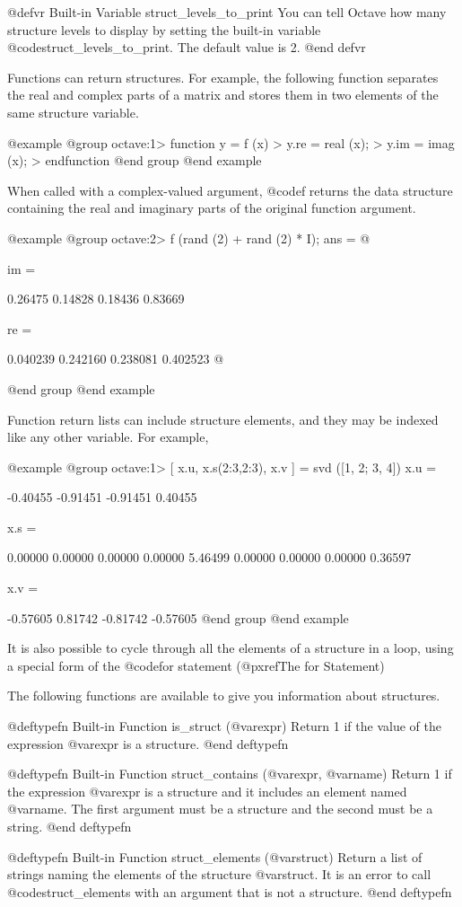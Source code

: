 @defvr {Built-in Variable} struct_levels_to_print
You can tell Octave how many structure levels to display by setting the
built-in variable @code{struct_levels_to_print}.  The default value is 2.
@end defvr

Functions can return structures.  For example, the following function
separates the real and complex parts of a matrix and stores them in two
elements of the same structure variable.

@example
@group
octave:1> function y = f (x)
> y.re = real (x);
> y.im = imag (x);
> endfunction
@end group
@end example

When called with a complex-valued argument, @code{f} returns the data
structure containing the real and imaginary parts of the original
function argument.

@example
@group
octave:2> f (rand (2) + rand (2) * I);
ans =
@{
  im =

    0.26475  0.14828
    0.18436  0.83669

  re =

    0.040239  0.242160
    0.238081  0.402523
@}
@end group
@end example

Function return lists can include structure elements, and they may be
indexed like any other variable.  For example,

@example
@group
octave:1> [ x.u, x.s(2:3,2:3), x.v ] = svd ([1, 2; 3, 4])
x.u =

  -0.40455  -0.91451
  -0.91451   0.40455

x.s =

  0.00000  0.00000  0.00000
  0.00000  5.46499  0.00000
  0.00000  0.00000  0.36597

x.v =

  -0.57605   0.81742
  -0.81742  -0.57605
@end group
@end example

It is also possible to cycle through all the elements of a structure in
a loop, using a special form of the @code{for} statement
(@pxref{The for Statement})

The following functions are available to give you information about
structures.

@deftypefn {Built-in Function} {} is_struct (@var{expr})
Return 1 if the value of the expression @var{expr} is a structure.
@end deftypefn

@deftypefn {Built-in Function} {} struct_contains (@var{expr}, @var{name})
Return 1 if the expression @var{expr} is a structure and it includes an
element named @var{name}.  The first argument must be a structure and
the second must be a string.
@end deftypefn

@deftypefn {Built-in Function} {} struct_elements (@var{struct})
Return a list of strings naming the elements of the structure
@var{struct}.  It is an error to call @code{struct_elements} with an
argument that is not a structure.
@end deftypefn

